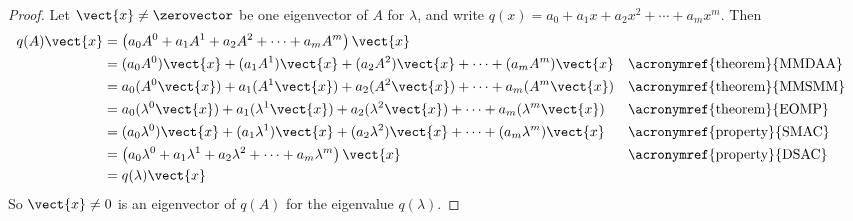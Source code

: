\begin{proof}
%
Let $\vect{x}\neq\zerovector$ be one eigenvector of $A$ for $\lambda$, and write $q(x)=a_0+a_1x+a_2x^2+\cdots+a_mx^m$.  Then
%
\begin{align*}
q(A)\vect{x}&=\left(a_0A^0+a_1A^1+a_2A^2+\cdots+a_mA^m\right)\vect{x}\\
&=(a_0A^0)\vect{x}+(a_1A^1)\vect{x}+(a_2A^2)\vect{x}+\cdots+(a_mA^m)\vect{x}&&\text{\acronymref{theorem}{MMDAA}}\\
&=a_0(A^0\vect{x})+a_1(A^1\vect{x})+a_2(A^2\vect{x})+\cdots+a_m(A^m\vect{x})&&\text{\acronymref{theorem}{MMSMM}}\\
&=a_0(\lambda^0\vect{x})+a_1(\lambda^1\vect{x})+a_2(\lambda^2\vect{x})+\cdots+a_m(\lambda^m\vect{x})&&\text{\acronymref{theorem}{EOMP}}\\
&=(a_0\lambda^0)\vect{x}+(a_1\lambda^1)\vect{x}+(a_2\lambda^2)\vect{x}+\cdots+(a_m\lambda^m)\vect{x}&&\text{\acronymref{property}{SMAC}}\\
&=\left(a_0\lambda^0+a_1\lambda^1+a_2\lambda^2+\cdots+a_m\lambda^m\right)\vect{x}&&\text{\acronymref{property}{DSAC}}\\
&=q(\lambda)\vect{x}
%
\end{align*}
%
So $\vect{x}\neq 0$ is an eigenvector of $q(A)$ for the eigenvalue $q(\lambda)$.
%
\end{proof}
%
%
